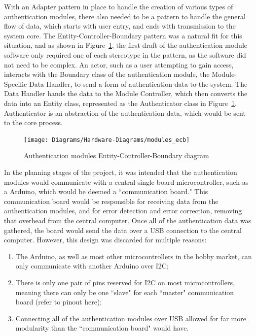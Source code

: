\documentclass[12pt]{report}
\begin{document}
With an Adapter pattern in place to handle the creation of various types of authentication modules, there also needed to 
be a pattern to handle the general flow of data, which starts with user entry, and ends with transmission to the system
core. The Entity-Controller-Boundary pattern was a natural fit for this situation, and as shown in 
Figure~\ref{fig:modules-ecb}, the first draft of the authentication module software only required one of each 
stereotype in the pattern, as the software did not need to be complex. An actor, such as a user attempting to gain 
access, interacts with the Boundary class of the authentication module, the Module-Specific Data Handler, to send a 
form of authentication data to the system. The Data Handler hands the data to the Module Controller, which then 
converts the data into an Entity class, represented as the Authenticator class in Figure~\ref{fig:modules-ecb}. 
Authenticator is an abstraction of the authentication data, which would be sent to the core process.

\begin{figure}
    \texttt{[image: Diagrams/Hardware-Diagrams/modules\_ecb]}
    \caption{Authentication modules Entity-Controller-Boundary diagram}
    \label{fig:modules-ecb}
\end{figure}

In the planning stages of the project, it was intended that the authentication modules would communicate with a central 
single-board microcontroller, such as a Arduino, which would be deemed a ``communication board." This communication board
would be responsible for receiving data from the authentication modules, and for error detection and error correction, 
removing that overhead from the central computer. Once all of the authentication data was gathered, the board would send 
the data over a USB connection to the central computer. However, this design was discarded for multiple reasons:
\begin{enumerate}
    \item The Arduino, as well as most other microcontrollers in the hobby market, can only communicate with another 
    Arduino over I2C;
    \item There is only one pair of pins reserved for I2C on most microcontrollers, meaning there can only be one 
    ``slave" for each ``master" communication board (refer to pinout here);
    \item Connecting all of the authentication modules over USB allowed for far more modularity than the ``communication
    board" would have.
\end{enumerate}
\end{document}
